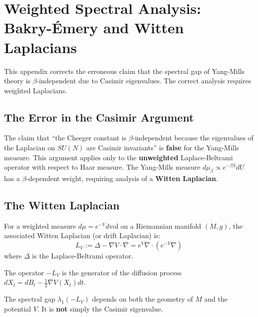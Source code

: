 \section{Weighted Spectral Analysis: Bakry-\'Emery and Witten Laplacians}
\label{sec:weighted-spectral}

This appendix corrects the erroneous claim that the spectral gap of Yang-Mills theory is $\beta$-independent due to Casimir eigenvalues. The correct analysis requires weighted Laplacians.

\subsection{The Error in the Casimir Argument}

\begin{warning}
The claim that ``the Cheeger constant is $\beta$-independent because the eigenvalues of the Laplacian on $SU(N)$ are Casimir invariants'' is \textbf{false} for the Yang-Mills measure. This argument applies only to the \textbf{unweighted} Laplace-Beltrami operator with respect to Haar measure. The Yang-Mills measure $d\mu_\beta \propto e^{-\beta S} dU$ has a $\beta$-dependent weight, requiring analysis of a \textbf{Witten Laplacian}.
\end{warning}

\subsection{The Witten Laplacian}

\begin{definition}
For a weighted measure $d\mu = e^{-V} d\text{vol}$ on a Riemannian manifold $(M, g)$, the associated Witten Laplacian (or drift Laplacian) is:
\begin{equation}
    L_V := \Delta - \nabla V \cdot \nabla = e^V \nabla \cdot (e^{-V} \nabla)
\end{equation}
where $\Delta$ is the Laplace-Beltrami operator.

The operator $-L_V$ is the generator of the diffusion process $dX_t = dB_t - \frac{1}{2} \nabla V(X_t) dt$.
\end{definition}

\begin{proposition}
The spectral gap $\lambda_1(-L_V)$ depends on both the geometry of $M$ and the potential $V$. It is \textbf{not} simply the Casimir eigenvalue.
\end{proposition}

